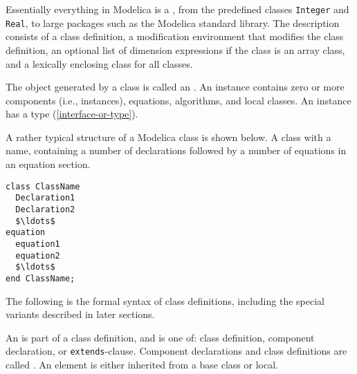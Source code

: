 Essentially everything in Modelica is a , from the predefined classes \lstinline!Integer! and \lstinline!Real!, to large packages such as the Modelica standard library.
The description consists of a class definition, a modification environment that modifies the class definition, an optional list of dimension expressions if the class is an array class, and a lexically
enclosing class for all classes.

The object generated by a class is called an .
An instance contains zero or more components (i.e., instances), equations, algorithms, and local classes.
An instance has a type (\cref{interface-or-type}).

\begin{example}
A rather typical structure of a Modelica class is
shown below. A class with a name, containing a number of declarations
followed by a number of equations in an equation section.

\begin{lstlisting}[language=modelica]
class ClassName
  Declaration1
  Declaration2
  $\ldots$
equation
  equation1
  equation2
  $\ldots$
end ClassName;
\end{lstlisting}
\end{example}

The following is the formal syntax of class definitions, including the special variants described in later sections.

An  is part of a class definition, and is one of: class definition, component declaration, or \lstinline!extends!-clause.
Component declarations and class definitions are called .
An element is either inherited from a base class or local.

